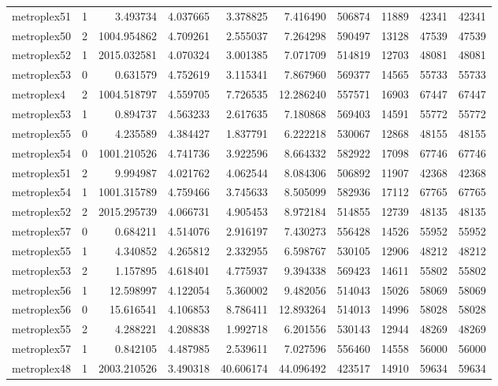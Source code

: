 \begin{longtable}{|l|r|r|r|r|r|r|r|r|r|}
metroplex51 & 1 & 3.493734 & 4.037665 & 3.378825 & 7.416490 & 506874 & 11889 & 42341 & 42341 \\
metroplex50 & 2 & 1004.954862 & 4.709261 & 2.555037 & 7.264298 & 590497 & 13128 & 47539 & 47539 \\
metroplex52 & 1 & 2015.032581 & 4.070324 & 3.001385 & 7.071709 & 514819 & 12703 & 48081 & 48081 \\
metroplex53 & 0 & 0.631579 & 4.752619 & 3.115341 & 7.867960 & 569377 & 14565 & 55733 & 55733 \\
metroplex4 & 2 & 1004.518797 & 4.559705 & 7.726535 & 12.286240 & 557571 & 16903 & 67447 & 67447 \\
metroplex53 & 1 & 0.894737 & 4.563233 & 2.617635 & 7.180868 & 569403 & 14591 & 55772 & 55772 \\
metroplex55 & 0 & 4.235589 & 4.384427 & 1.837791 & 6.222218 & 530067 & 12868 & 48155 & 48155 \\
metroplex54 & 0 & 1001.210526 & 4.741736 & 3.922596 & 8.664332 & 582922 & 17098 & 67746 & 67746 \\
metroplex51 & 2 & 9.994987 & 4.021762 & 4.062544 & 8.084306 & 506892 & 11907 & 42368 & 42368 \\
metroplex54 & 1 & 1001.315789 & 4.759466 & 3.745633 & 8.505099 & 582936 & 17112 & 67765 & 67765 \\
metroplex52 & 2 & 2015.295739 & 4.066731 & 4.905453 & 8.972184 & 514855 & 12739 & 48135 & 48135 \\
metroplex57 & 0 & 0.684211 & 4.514076 & 2.916197 & 7.430273 & 556428 & 14526 & 55952 & 55952 \\
metroplex55 & 1 & 4.340852 & 4.265812 & 2.332955 & 6.598767 & 530105 & 12906 & 48212 & 48212 \\
metroplex53 & 2 & 1.157895 & 4.618401 & 4.775937 & 9.394338 & 569423 & 14611 & 55802 & 55802 \\
metroplex56 & 1 & 12.598997 & 4.122054 & 5.360002 & 9.482056 & 514043 & 15026 & 58069 & 58069 \\
metroplex56 & 0 & 15.616541 & 4.106853 & 8.786411 & 12.893264 & 514013 & 14996 & 58028 & 58028 \\
metroplex55 & 2 & 4.288221 & 4.208838 & 1.992718 & 6.201556 & 530143 & 12944 & 48269 & 48269 \\
metroplex57 & 1 & 0.842105 & 4.487985 & 2.539611 & 7.027596 & 556460 & 14558 & 56000 & 56000 \\
metroplex48 & 1 & 2003.210526 & 3.490318 & 40.606174 & 44.096492 & 423517 & 14910 & 59634 & 59634 \\

\end{longtable}
